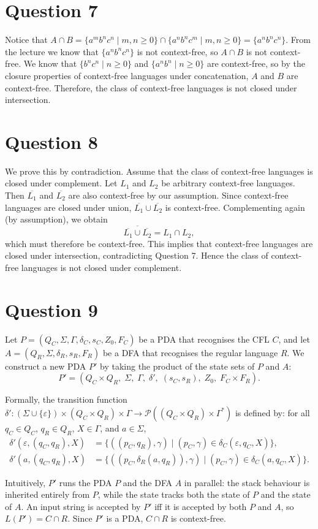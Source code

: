 \documentclass[a4paper, UTF-8]{article}
\theoremstyle{plain}
\begin{document}
\section{Question 7} 

Notice that $A \cap B = \{a^mb^nc^n \mid m,n \geq 0\} \cap \{a^nb^nc^m \mid m,n \geq 0\} = \{a^nb^nc^n\}$. From the lecture we know that $\{a^nb^nc^n\}$ is not context-free, so $A \cap B$ is not context-free. We know that $\{b^nc^n\mid n \geq 0\}$ and $\{a^nb^n\mid n \geq 0\}$ are context-free, so by the closure properties of context-free languages under concatenation, $A$ and $B$ are context-free. Therefore, the class of context-free languages is not closed under intersection.

\section{Question 8}

We prove this by contradiction. Assume that the class of context-free languages is closed under complement. Let $L_1$ and $L_2$ be arbitrary context-free languages. Then $\overline{L_1}$ and $\overline{L_2}$ are also context-free by our assumption. Since context-free languages are closed under union, $\overline{L_1} \cup \overline{L_2}$ is context-free. Complementing again (by assumption), we obtain
\[
    \overline{\overline{L_1} \cup \overline{L_2}} = L_1 \cap L_2 ,
\]
which must therefore be context-free. This implies that context-free languages are closed under intersection, contradicting Question 7. Hence the class of context-free languages is not closed under complement.

\section{Question 9}

Let $P = (Q_C, \Sigma, \Gamma, \delta_C, s_C, Z_0, F_C)$ be a PDA that recognises the CFL $C$, and let $A = (Q_R, \Sigma, \delta_R, s_R, F_R)$ be a DFA that recognises the regular language $R$. We construct a new PDA $P'$ by taking the product of the state sets of $P$ and $A$:
\[
    P' = (Q_C \times Q_R,\; \Sigma,\; \Gamma,\; \delta',\; (s_C, s_R),\; Z_0,\; F_C \times F_R).
\]

Formally, the transition function $\delta' : (\Sigma \cup \{\varepsilon\}) \times (Q_C \times Q_R) \times \Gamma \to \mathcal{P}((Q_C \times Q_R) \times \Gamma^{*})$ is defined by: for all $q_C \in Q_C$, $q_R \in Q_R$, $X \in \Gamma$, and $a \in \Sigma$,
\begin{align*}
    \delta'(\varepsilon, (q_C, q_R), X) &= \big\{ ((p_C, q_R), \gamma) \mid (p_C, \gamma) \in \delta_C(\varepsilon, q_C, X) \big\}, \\
    \delta'(a, (q_C, q_R), X) &= \big\{ ((p_C, \delta_R(a, q_R)), \gamma) \mid (p_C, \gamma) \in \delta_C(a, q_C, X) \big\}.
\end{align*}

Intuitively, $P'$ runs the PDA $P$ and the DFA $A$ in parallel: the stack behaviour is inherited entirely from $P$, while the state tracks both the state of $P$ and the state of $A$. An input string is accepted by $P'$ iff it is accepted by both $P$ and $A$, so $L(P') = C \cap R$. Since $P'$ is a PDA, $C \cap R$ is context-free.
\end{document}
